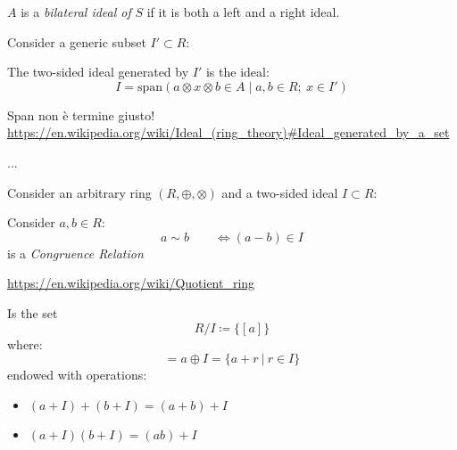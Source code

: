 \documentclass[a4paper,12pt]{scrartcl}    %
\newcommand{\OpA}{\otimes}
\newcommand{\OpB}{\oplus}
\begin{document}
	\begin{definition}
		$A$ is a \emph{bilateral ideal of} $S$ if it is both a left and a right ideal.
	\end{definition}

	Consider a generic subset $I' \subset R$:
	\begin{definition}
		The two-sided ideal generated by $I'$ is the ideal:
		\begin{displaymath}
			I = \textrm{span} \left( a \OpA x \OpA b \in A \; \vert \; a,b\in R ; \: x \in I' \right)
		\end{displaymath}
		\begin{Warning}
			Span non è termine giusto! \url{https://en.wikipedia.org/wiki/Ideal_(ring_theory)#Ideal_generated_by_a_set}
		\end{Warning}
	
	
	\end{definition}


	\begin{Warning}
		...
	\end{Warning}
	
	Consider an arbitrary ring $(R,\OpB,\OpA)$ and a two-sided ideal $I\subset R$:
	\begin{proposition}
		Consider $a,b \in R$:
		\begin{displaymath}
			a \sim b \qquad \Leftrightarrow (a  - b ) \in I
		\end{displaymath}
		is a \emph{Congruence Relation}
	\end{proposition}
	\url{https://en.wikipedia.org/wiki/Quotient_ring}
	
	\begin{definition}
		Is the set 
		\begin{displaymath}
		 R/I \coloneqq \{ [a]\}
		\end{displaymath}
		where:
		\begin{displaymath}
			[a] = a \OpB I = \{ a + r \: \vert \: r \in I \}
		\end{displaymath}
		endowed with operations:
		\begin{itemize}
			\item $ (a + I) + (b + I) = (a + b) + I $
			\item $ (a + I)(b + I) = (a b) + I$
		\end{itemize}

	
	\end{definition}
\end{document}
